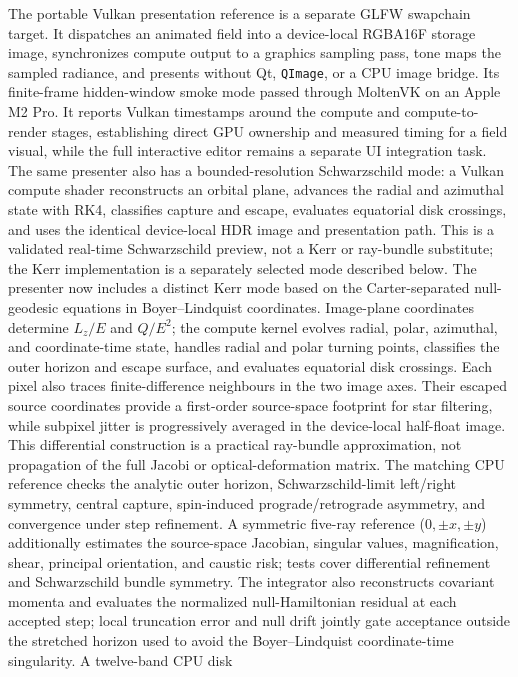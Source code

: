 \documentclass[10pt]{article}
\begin{document}
The portable Vulkan presentation reference is a separate GLFW swapchain target. It dispatches an
animated field into a device-local RGBA16F storage image, synchronizes compute output to a graphics
sampling pass, tone maps the sampled radiance, and presents without Qt, \texttt{QImage}, or a CPU
image bridge. Its finite-frame hidden-window smoke mode passed through MoltenVK on an Apple M2 Pro.
It reports Vulkan timestamps around the compute and compute-to-render stages, establishing direct
GPU ownership and measured timing for a field visual, while the full interactive editor remains a
separate UI integration task.
The same presenter also has a bounded-resolution Schwarzschild mode: a Vulkan compute shader
reconstructs an orbital plane, advances the radial and azimuthal state with RK4, classifies capture
and escape, evaluates equatorial disk crossings, and uses the identical device-local HDR image and
presentation path. This is a validated real-time Schwarzschild preview, not a Kerr or ray-bundle
substitute; the Kerr implementation is a separately selected mode described below.
The presenter now includes a distinct Kerr mode based on the Carter-separated null-geodesic
equations in Boyer--Lindquist coordinates. Image-plane coordinates determine $L_z/E$ and $Q/E^2$;
the compute kernel evolves radial, polar, azimuthal, and coordinate-time state, handles radial and
polar turning points, classifies the outer horizon and escape surface, and evaluates equatorial
disk crossings. Each pixel also traces finite-difference neighbours in the two image axes. Their
escaped source coordinates provide a first-order source-space footprint for star filtering, while
subpixel jitter is progressively averaged in the device-local half-float image. This differential
construction is a practical ray-bundle approximation, not propagation of the full Jacobi or
optical-deformation matrix.
The matching CPU reference checks the analytic outer horizon, Schwarzschild-limit left/right
symmetry, central capture, spin-induced prograde/retrograde asymmetry, and convergence under step
refinement. A symmetric five-ray reference ($0,\pm x,\pm y$) additionally estimates the
source-space Jacobian, singular values, magnification, shear, principal orientation, and caustic
risk; tests cover differential refinement and Schwarzschild bundle symmetry. The integrator also
reconstructs covariant momenta and evaluates the normalized null-Hamiltonian residual at each
accepted step; local truncation error and null drift jointly gate acceptance outside the stretched
horizon used to avoid the Boyer--Lindquist coordinate-time singularity. A twelve-band CPU disk
\end{document}

